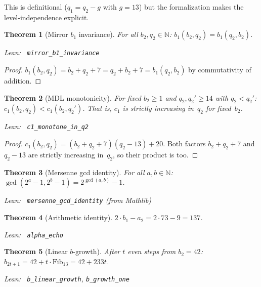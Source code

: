 \documentclass[11pt,a4paper]{article}
\newenvironment{leanref}%
  {\par\smallskip\noindent\begingroup\raggedright\textup{Lean:}~}%
  {\par\endgroup}
\newtheorem{theorem}{Theorem}[section]
\theoremstyle{definition}
\newcommand{\N}{\mathbb{N}}
\newcommand{\Fib}{\ensuremath{\mathrm{Fib}}}
\begin{document}
This is definitional ($q_1 = q_2 - g$ with $g = 13$) but the
formalization makes the level-independence explicit.

\begin{theorem}[Mirror $b_1$ invariance]\label{thm:mirror-b1}
For all $b_2, q_2 \in \N$:
$b_1(b_2, q_2) = b_1(q_2, b_2)$.

\begin{leanref} \lstinline|mirror_b1_invariance|
\end{leanref}
\end{theorem}

\begin{proof}
$b_1(b_2, q_2) = b_2 + q_2 + 7 = q_2 + b_2 + 7 = b_1(q_2, b_2)$
by commutativity of addition.
\end{proof}

\begin{theorem}[MDL monotonicity]\label{thm:mdl-mono}
For fixed $b_2 \ge 1$ and $q_2, q_2' \ge 14$ with $q_2 < q_2'$:
$c_1(b_2, q_2) < c_1(b_2, q_2')$.
That is, $c_1$ is strictly increasing in~$q_2$ for fixed~$b_2$.

\begin{leanref} \lstinline|c1_monotone_in_q2|
\end{leanref}
\end{theorem}

\begin{proof}
$c_1(b_2, q_2) = (b_2 + q_2 + 7)(q_2 - 13) + 20$.
Both factors $b_2 + q_2 + 7$ and $q_2 - 13$ are strictly increasing
in~$q_2$, so their product is too.
\end{proof}

\begin{theorem}[Mersenne gcd identity]\label{thm:mersenne-gcd}
For all $a, b \in \N$:
$\gcd(2^a - 1, 2^b - 1) = 2^{\gcd(a,b)} - 1$.

\begin{leanref} \lstinline|mersenne_gcd_identity|
\textup{(from Mathlib)}
\end{leanref}
\end{theorem}

\begin{theorem}[Arithmetic identity]\label{thm:arith137}
$2 \cdot b_1 - a_2 = 2 \cdot 73 - 9 = 137$.

\begin{leanref} \lstinline|alpha_echo|
\end{leanref}
\end{theorem}

\begin{theorem}[Linear $b$-growth]\label{thm:b-growth}
After $t$ even steps from $b_2 = 42$:
$b_{2t+1} = 42 + t \cdot \Fib_{13} = 42 + 233t$.

\begin{leanref} \lstinline|b_linear_growth|, \lstinline|b_growth_one|
\end{leanref}
\end{theorem}
\end{document}
